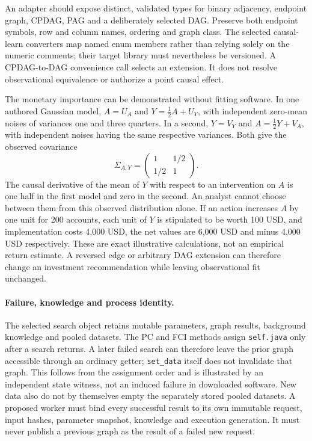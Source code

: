An adapter should expose distinct, validated types for binary adjacency,
endpoint graph, CPDAG, PAG and a deliberately selected DAG. Preserve both
endpoint symbols, row and column names, ordering and graph class. The selected
causal-learn converters map named enum members rather than relying solely on
the numeric comments; their target library must nevertheless be versioned.
A CPDAG-to-DAG convenience call selects an extension. It does not resolve
observational equivalence or authorize a point causal effect.
\citep{exec24_pytetrad_source}

The monetary importance can be demonstrated without fitting software. In one
authored Gaussian model, $A=U_A$ and $Y=\tfrac12 A+U_Y$, with independent
zero-mean noises of variances one and three quarters. In a second, $Y=V_Y$
and $A=\tfrac12 Y+V_A$, with independent noises having the same respective
variances. Both give the observed covariance
\[
 \Sigma_{A,Y}=\begin{pmatrix}1&1/2\\1/2&1\end{pmatrix}.
\]
The causal derivative of the mean of $Y$ with respect to an intervention on
$A$ is one half in the first model and zero in the second. An analyst cannot
choose between them from this observed distribution alone. If an action
increases $A$ by one unit for 200 accounts, each unit of $Y$ is stipulated to
be worth 100 USD, and implementation costs 4,000 USD, the net values are
6,000 USD and minus 4,000 USD respectively. These are exact illustrative
calculations, not an empirical return estimate. A reversed edge or arbitrary
DAG extension can therefore change an investment recommendation while leaving
observational fit unchanged.~\citep{exec24_pytetrad_choice}

\paragraph{Failure, knowledge and process identity.}
The selected search object retains mutable parameters, graph results,
background knowledge and pooled datasets. The PC and FCI methods assign
\texttt{self.java} only after a search returns. A later failed search can
therefore leave the prior graph accessible through an ordinary getter;
\texttt{set\_data} itself does not invalidate that graph. This follows from
the assignment order and is illustrated by an independent state witness,
not an induced failure in downloaded software. New data also do not by
themselves empty the separately stored pooled datasets. A proposed worker
must bind every successful result to its own immutable request, input hashes,
parameter snapshot, knowledge and execution generation. It must never publish
a previous graph as the result of a failed new request.
\citep{exec24_pytetrad_source,exec24_pytetrad_choice}

